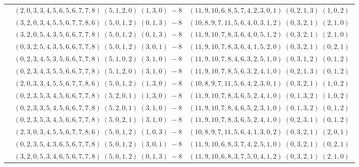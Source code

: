 \documentclass[11pt]{article}
\begin{document}
\begin{longtable}[l]{|c|c|c|}
 \cline{2-3} 
 & $(2 ,0 ,3 ,3 ,4 ,5 ,6 ,5 ,6 ,7 ,7 ,8) \;(5 ,1 ,2 ,0) \;(1 ,3 ,0) \;-8$ & $(11 ,9 ,10 ,6 ,8 ,5 ,7 ,4 ,2 ,3 ,0 ,1) \;(0 ,2 ,1 ,3) \;(1 ,0 ,2) \;$\\ 
 \cline{2-3} 
 & $(3 ,2 ,0 ,3 ,4 ,5 ,5 ,6 ,7 ,7 ,8 ,6) \;(5 ,0 ,1 ,2) \;(0 ,1 ,3) \;-8$ & $(10 ,8 ,9 ,7 ,11 ,5 ,6 ,4 ,0 ,3 ,1 ,2) \;(0 ,3 ,2 ,1) \;(2 ,1 ,0) \;$\\ 
 \cline{2-3} 
 & $(3 ,2 ,0 ,5 ,4 ,3 ,5 ,6 ,6 ,7 ,7 ,8) \;(5 ,0 ,1 ,2) \;(0 ,1 ,3) \;-8$ & $(11 ,9 ,10 ,7 ,8 ,3 ,6 ,4 ,0 ,5 ,1 ,2) \;(0 ,3 ,2 ,1) \;(2 ,1 ,0) \;$\\ 
 \cline{2-3} 
 & $(0 ,3 ,2 ,5 ,4 ,3 ,5 ,6 ,6 ,7 ,7 ,8) \;(5 ,0 ,1 ,2) \;(3 ,0 ,1) \;-8$ & $(11 ,9 ,10 ,7 ,8 ,3 ,6 ,4 ,1 ,5 ,2 ,0) \;(0 ,3 ,2 ,1) \;(0 ,2 ,1) \;$\\ 
 \cline{2-3} 
 & $(0 ,2 ,3 ,4 ,5 ,3 ,5 ,6 ,6 ,7 ,7 ,8) \;(5 ,1 ,0 ,2) \;(3 ,1 ,0) \;-8$ & $(11 ,9 ,10 ,7 ,8 ,4 ,6 ,3 ,2 ,5 ,1 ,0) \;(0 ,3 ,1 ,2) \;(0 ,1 ,2) \;$\\ 
 \cline{2-3} 
 & $(0 ,2 ,3 ,4 ,3 ,5 ,5 ,6 ,6 ,7 ,7 ,8) \;(5 ,1 ,2 ,0) \;(3 ,1 ,0) \;-8$ & $(11 ,9 ,10 ,7 ,8 ,5 ,6 ,3 ,2 ,4 ,1 ,0) \;(0 ,2 ,1 ,3) \;(0 ,1 ,2) \;$\\ 
 \cline{2-3} 
 & $(2 ,0 ,3 ,3 ,4 ,5 ,5 ,6 ,7 ,7 ,8 ,6) \;(5 ,0 ,1 ,2) \;(1 ,3 ,0) \;-8$ & $(10 ,8 ,9 ,7 ,11 ,5 ,6 ,4 ,2 ,3 ,0 ,1) \;(0 ,3 ,2 ,1) \;(1 ,0 ,2) \;$\\ 
 \cline{2-3} 
 & $(0 ,2 ,3 ,5 ,3 ,4 ,5 ,6 ,6 ,7 ,7 ,8) \;(5 ,2 ,0 ,1) \;(1 ,3 ,0) \;-8$ & $(11 ,9 ,10 ,7 ,8 ,3 ,6 ,5 ,2 ,4 ,1 ,0) \;(0 ,1 ,3 ,2) \;(1 ,0 ,2) \;$\\ 
 \cline{2-3} 
 & $(0 ,2 ,3 ,3 ,5 ,4 ,5 ,6 ,6 ,7 ,7 ,8) \;(5 ,2 ,0 ,1) \;(3 ,1 ,0) \;-8$ & $(11 ,9 ,10 ,7 ,8 ,4 ,6 ,5 ,2 ,3 ,1 ,0) \;(0 ,1 ,3 ,2) \;(0 ,1 ,2) \;$\\ 
 \cline{2-3} 
 & $(0 ,2 ,3 ,5 ,3 ,4 ,5 ,6 ,6 ,7 ,7 ,8) \;(5 ,0 ,2 ,1) \;(3 ,1 ,0) \;-8$ & $(11 ,9 ,10 ,7 ,8 ,3 ,6 ,5 ,2 ,4 ,1 ,0) \;(0 ,2 ,3 ,1) \;(0 ,1 ,2) \;$\\ 
 \cline{2-3} 
 & $(2 ,3 ,0 ,3 ,4 ,5 ,5 ,6 ,7 ,7 ,8 ,6) \;(5 ,0 ,1 ,2) \;(1 ,0 ,3) \;-8$ & $(10 ,8 ,9 ,7 ,11 ,5 ,6 ,4 ,1 ,3 ,0 ,2) \;(0 ,3 ,2 ,1) \;(2 ,0 ,1) \;$\\ 
 \cline{2-3} 
 & $(0 ,2 ,3 ,5 ,4 ,3 ,6 ,5 ,6 ,7 ,7 ,8) \;(5 ,0 ,1 ,2) \;(3 ,0 ,1) \;-8$ & $(11 ,9 ,10 ,6 ,8 ,3 ,7 ,4 ,2 ,5 ,1 ,0) \;(0 ,3 ,2 ,1) \;(0 ,2 ,1) \;$\\ 
 \cline{2-3} 
 & $(3 ,2 ,0 ,5 ,3 ,4 ,6 ,5 ,6 ,7 ,7 ,8) \;(5 ,0 ,1 ,2) \;(0 ,1 ,3) \;-8$ & $(11 ,9 ,10 ,6 ,8 ,3 ,7 ,5 ,0 ,4 ,1 ,2) \;(0 ,3 ,2 ,1) \;(2 ,1 ,0) \;$\\ 

\end{longtable}
\end{document}
